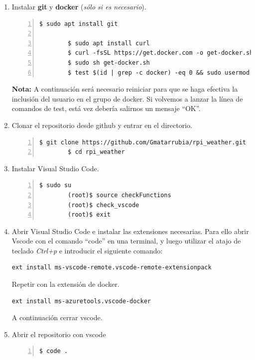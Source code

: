 \begin{enumerate}
    \item Instalar \textbf{\gls{git}} y \textbf{docker} (\emph{sólo si es necesario}).
    \begin{lstlisting}[style=consola, numbers=left]
        $ sudo apt install git

        $ sudo apt install curl
        $ curl -fsSL https://get.docker.com -o get-docker.sh
        $ sudo sh get-docker.sh
        $ test $(id | grep -c docker) -eq 0 && sudo usermod -aG docker $(whoami) || echo "OK"
    \end{lstlisting}
    \textbf{Nota:} A continuación será necesario reiniciar para que se haga efectiva la
    inclusión del usuario en el grupo de docker. Si volvemos a lanzar la línea de
    comandos de test, está vez debería salirnos un mensaje ``OK''.

    \item Clonar el repositorio desde github y entrar en el directorio.
    \begin{lstlisting}[style=consola, numbers=left]
        $ git clone https://github.com/Gmatarrubia/rpi_weather.git
        $ cd rpi_weather
    \end{lstlisting}

    \item Instalar Visual Studio Code.
    \begin{lstlisting}[style=consola, numbers=left]
        $ sudo su
        (root)$ source checkFunctions
        (root)$ check_vscode
        (root)$ exit
    \end{lstlisting}

    \item Abrir Visual Studio Code e instalar las extensiones necesarias. Para ello
    abrir Vscode con el comando ``code'' en una terminal, y luego utilizar el atajo de
    teclado \emph{Ctrl+p} e introducir el siguiente comando:
    \begin{lstlisting}[style=cmd]
        ext install ms-vscode-remote.vscode-remote-extensionpack
    \end{lstlisting}
    Repetir con la extensión de docker.
    \begin{lstlisting}[style=cmd]
        ext install ms-azuretools.vscode-docker
    \end{lstlisting}
    A continuación cerrar \gls{vscode}.

    \item Abrir el repositorio con \gls{vscode}
    \begin{lstlisting}[style=consola, numbers=left]
        $ code .
    \end{lstlisting}


\end{enumerate}
